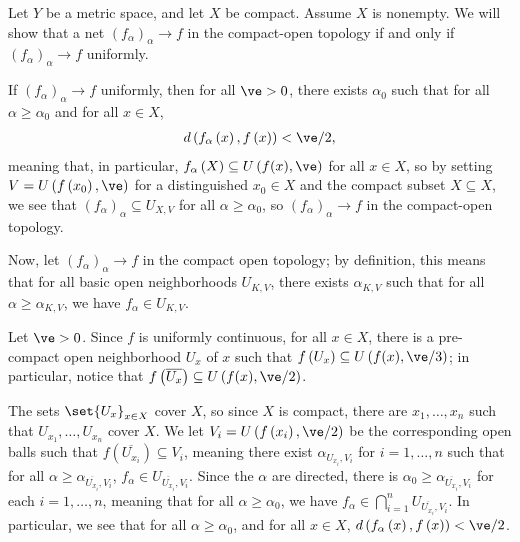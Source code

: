 \documentclass[10pt]{mypackage}
\begin{document}
\begin{solution}
  Let $Y$ be a metric space, and let $X$ be compact. Assume $X$ is nonempty. We will show that a net $\left( f_{\alpha} \right)_{\alpha}\rightarrow f$ in the compact-open topology if and only if $\left( f_{\alpha} \right)_{\alpha}\rightarrow f$ uniformly.\newline

  If $\left( f_{\alpha} \right)_{\alpha}\rightarrow f$ uniformly, then for all $\ve > 0$, there exists $\alpha_0$ such that for all $\alpha \geq \alpha_0$ and for all $x\in X$,
  \begin{align*}
    d\left( f_{\alpha}\left( x \right),f\left( x \right) \right) < \ve/2,
  \end{align*}
  meaning that, in particular, $f_{\alpha}\left( X \right)\subseteq U\left( f(x),\ve \right)$ for all $x\in X$, so by setting $V = U\left( f\left( x_0 \right),\ve \right)$ for a distinguished $x_0\in X$ and the compact subset $X\subseteq X$, we see that $\left( f_{\alpha} \right)_{\alpha}\subseteq U_{X,V}$ for all $\alpha \geq \alpha_0$, so $\left( f_{\alpha} \right)_{\alpha}\rightarrow f$ in the compact-open topology.\newline

  Now, let $\left( f_{\alpha} \right)_{\alpha}\rightarrow f$ in the compact open topology; by definition, this means that for all basic open neighborhoods $U_{K,V}$, there exists $\alpha_{K,V}$ such that for all $\alpha\geq \alpha_{K,V}$, we have $f_{\alpha}\in U_{K,V}$.\newline

  Let $\ve > 0$. Since $f$ is uniformly continuous, for all $x\in X$, there is a pre-compact open neighborhood $U_x$ of $x$ such that $f\left( U_x \right)\subseteq U\left( f(x), \ve/3\right)$; in particular, notice that $f\left( \overline{U_x} \right)\subseteq U\left( f(x),\ve/2 \right)$.\newline

  The sets $\set{U_x}_{x\in X}$ cover $X$, so since $X$ is compact, there are $x_1,\dots,x_n$ such that $U_{x_1},\dots,U_{x_n}$ cover $X$. We let $V_i = U\left( f\left( x_i \right),\ve/2 \right)$ be the corresponding open balls such that $f\left( \overline{U_{x_i}} \right)\subseteq V_i$, meaning there exist $\alpha_{U_{x_i},V_i}$ for $i=1,\dots,n$ such that for all $\alpha \geq \alpha_{ \overline{U_{x_i}},V_i}$, $f_{\alpha}\in U_{ \overline{U_{x_i}},V_{i}}$. Since the $\alpha$ are directed, there is $\alpha_0\geq \alpha_{ \overline{U_{x_i}},V_i}$ for each $i = 1,\dots,n$, meaning that for all $\alpha \geq \alpha_{0}$, we have $f_{\alpha}\in \bigcap_{i=1}^{n}U_{ \overline{U_{x_i}},V_i}$. In particular, we see that for all $\alpha \geq \alpha_0$, and for all $x\in X$, $d\left( f_{\alpha}\left( x \right),f\left( x \right) \right) < \ve/2$.
\end{solution}
\end{document}
